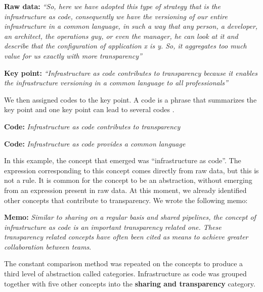 \textbf{Raw data:} \textit{``So, here we have adopted this type of strategy that is
the infrastructure as code, consequently we have the versioning of our entire
infrastructure in a common language, in such a way that any person, a
developer, an architect, the operations guy, or even the manager, he can look
at it and describe that the configuration of application x is y. So, it
aggregates too much value for us exactly with more transparency''}

\textbf{Key point:} \textit{``Infrastructure as code contributes to
transparency because it enables the infrastructure versioning in a common
language to all professionals''}

We then assigned codes to the key point. A code is a phrase that summarizes
the key point and one key point can lead to several codes \cite{hoda2017becoming}.

\textbf{Code:} \textit{Infrastructure as code contributes to transparency}

\textbf{Code:} \textit{Infrastructure as code provides a common language}

In this example, the concept that emerged was ``infrastructure as code''. The
expression corresponding to this concept comes directly from raw data, but this
is not a rule. It is common for the concept to be an abstraction, without
emerging from an expression present in raw data.
At this moment, we already identified other concepts that
contribute to transparency. We wrote the following memo:

\textbf{Memo:} \textit{Similar to sharing on a regular basis and shared
pipelines, the concept of infrastructure as code is an important transparency
related one. These transparency related concepts have often been cited as
means to achieve greater collaboration between teams}.

The constant comparison method was repeated on the concepts to produce a third
level of abstraction called categories. Infrastructure as code was grouped
together with five other concepts into the \textbf{sharing and transparency} category.
